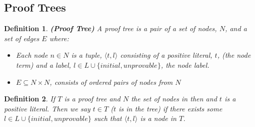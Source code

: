 \documentclass{blue-book}
\newtheorem{definition}{Definition}
\begin{document}
\subsection{Proof Trees}

\begin{definition}{\bf (Proof Tree)}
A proof tree is a pair of a set of nodes, $N$, and a set of edges $E$ where:
\begin{itemize}
\item Each node $n \in N$ is a tuple, $\langle t, l\rangle$ consisting of a positive literal, $t$, (the \emph{node term}) and a label, $l \in L \cup \{initial, unprovable\}$, the \emph{node label}.
\item $E \subseteq N \times N$, consists of ordered pairs of nodes from $N$
\end{itemize}
\end{definition}


\begin{definition}
If $T$ is a proof tree and $N$ the set of nodes in then and $t$ is a positive literal.  Then we say $t \in T$ ($t$ is in the tree) if there exists some $l \in L \cup \{initial, unprovable\}$ such that $\langle t, l \rangle$ is a node in $T$.
\end{definition}
\end{document}
